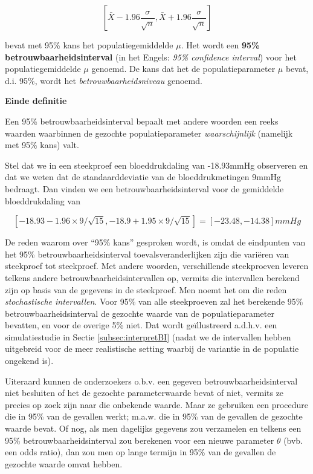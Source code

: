 \documentclass[
  12pt,dutch,coursenotes]{book}
\begin{document}
\begin{equation}
\left[\bar X - 1.96 \frac{\sigma}{\sqrt{n}},\bar X + 1.96 \frac{\sigma}{\sqrt{n}}\right] \label{eq:bi}
\end{equation}

bevat met 95\% kans het populatiegemiddelde \(\mu\). Het wordt een \textbf{95\% betrouwbaarheidsinterval} (in het Engels: \emph{95\% confidence interval}) voor het populatiegemiddelde \(\mu\) genoemd. De kans dat het de populatieparameter \(\mu\)
bevat, d.i. 95\%, wordt het \emph{betrouwbaarheidsniveau} genoemd.

\textbf{Einde definitie}

Een 95\% betrouwbaarheidsinterval bepaalt met andere woorden een reeks
waarden waarbinnen de gezochte populatieparameter \emph{waarschijnlijk}
(namelijk met 95\% kans) valt.

Stel dat we in een steekproef een bloeddrukdaling van -18.93mmHg observeren en dat we weten dat de standaarddeviatie van de bloeddrukmetingen 9mmHg bedraagt. Dan vinden we een betrouwbaarheidsinterval voor de gemiddelde bloeddrukdaling van

\[\left[-18.93-1.96\times 9/\sqrt{15},-18.9+1.95\times 9/\sqrt{15}\right]=[-23.48,-14.38]mmHg\]

De reden waarom over ``95\% kans'' gesproken wordt, is omdat de eindpunten van
het 95\% betrouwbaarheidsinterval toevalsveranderlijken zijn die variëren
van steekproef tot steekproef. Met andere woorden, verschillende
steekproeven leveren telkens andere betrouwbaarheidsintervallen op, vermits
die intervallen berekend zijn op basis van de gegevens in de steekproef. Men
noemt het om die reden \emph{stochastische intervallen}.
Voor 95\% van alle steekproeven zal het berekende 95\% betrouwbaarheidsinterval de
gezochte waarde van de populatieparameter bevatten, en voor de overige 5\%
niet. Dat wordt geïllustreerd a.d.h.v. een simulatiestudie in Sectie \ref{subsec:interpretBI} (nadat we de intervallen hebben uitgebreid voor de meer realistische setting waarbij de variantie in de populatie ongekend is).

Uiteraard kunnen de onderzoekers o.b.v. een gegeven betrouwbaarheidsinterval
niet besluiten of het de gezochte parameterwaarde bevat of niet, vermits ze
precies op zoek zijn naar die onbekende waarde. Maar ze gebruiken een
procedure die in 95\% van de gevallen werkt; m.a.w. die in 95\% van de
gevallen de gezochte waarde bevat. Of nog, als men dagelijks gegevens zou
verzamelen en telkens een 95\% betrouwbaarheidsinterval zou berekenen voor
een nieuwe parameter \(\theta\) (bvb. een odds ratio), dan zou men op lange termijn in 95\% van de gevallen de gezochte waarde omvat hebben.
\end{document}
